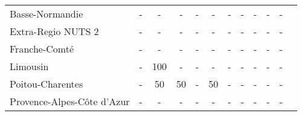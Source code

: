 \begin{table}[H]
\begin{tabularx}{\textwidth}{Xccccccccccc}
            Basse-Normandie  & - & - & - & - & - & - & - & - & - & - \\
            Extra-Regio NUTS 2 & - & - & - & - & - & - & - & - & - & - \\
            Franche-Comté & - & - & - & - & - & - & - & - & - & - \\
            Limousin & - & 100 & - & - & - & - & - & - & - & - \\
            Poitou-Charentes & - & 50 & 50 & - & 50 & - & - & - & - & - \\
            Provence-Alpes-Côte d’Azur & - & - & - & - & - & - & - & - & - & - \\
        \bottomrule
    \end{tabularx}
\end{table}
    